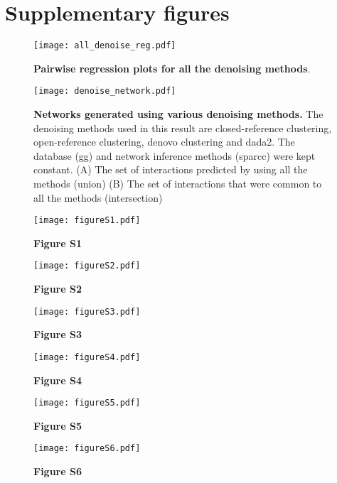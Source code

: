 
\section*{Supplementary figures}

  \renewcommand{\thefigure}{S\arabic{figure}}
  \setcounter{figure}{0}

  \begin{figure}[h!]
    \centering
    \texttt{[image: all\_denoise\_reg.pdf]}
    \caption{
      \textbf{Pairwise regression plots for all the denoising methods}.
    }
    \label{fig:all_denoise_reg}
  \end{figure}

  \begin{figure}[h!]
    \centering
    \texttt{[image: denoise\_network.pdf]}
    \caption{
      \textbf{Networks generated using various denoising methods.}
      The denoising methods used in this result are closed-reference clustering, open-reference clustering, denovo clustering and \ac{dada2}.
      The database (\ac{gg}) and network inference methods (\ac{sparcc}) were kept constant.
      (A) The set of interactions predicted by using all the methods (union)
      (B) The set of interactions that were common to all the methods (intersection)
    }
    \label{fig:denoise_network}
  \end{figure}


  \begin{figure}[h]
    \centering
    \texttt{[image: figureS1.pdf]}
    \label{fig:figureS1}
    \caption{
      \textbf{Figure S1}
    }
  \end{figure}

  \begin{figure}[h]
    \centering
    \texttt{[image: figureS2.pdf]}
    \label{fig:figureS2}
    \caption{
      \textbf{Figure S2}
    }
  \end{figure}

  \begin{figure}[h]
    \centering
    \texttt{[image: figureS3.pdf]}
    \label{fig:figureS3}
    \caption{
      \textbf{Figure S3}
    }
  \end{figure}

  \begin{figure}[h]
    \centering
    \texttt{[image: figureS4.pdf]}
    \label{fig:figureS4}
    \caption{
      \textbf{Figure S4}
    }
  \end{figure}

  \begin{figure}[h]
    \centering
    \texttt{[image: figureS5.pdf]}
    \label{fig:figureS5}
    \caption{
      \textbf{Figure S5}
    }
  \end{figure}

  \begin{figure}[h]
    \centering
    \texttt{[image: figureS6.pdf]}
    \label{fig:figureS6}
    \caption{
      \textbf{Figure S6}
    }
  \end{figure}

